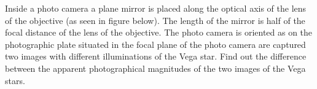 Inside a photo camera a plane mirror is placed along the optical axis of the
lens of the objective (as seen in figure below). The length of the mirror is
half of the focal distance of the lens of the objective. The photo camera is
oriented as on the photographic plate situated in the focal plane of the photo
camera are captured two images with different illuminations of the Vega star.
Find out the difference between the apparent photographical magnitudes of the
two images of the Vega stars.


